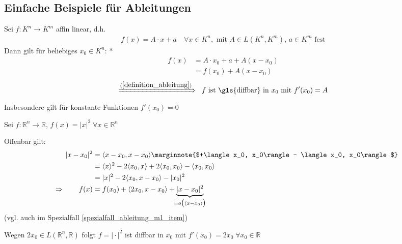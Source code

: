 \subsection*{Einfache Beispiele für Ableitungen}
\begin{example}
	Sei $f:K^n\to K^m$ affin linear, d.h. \begin{align*}
		f(x) = A\cdot x + a\quad \forall x\in K^n, \text{ mit } A\in L(K^n, K^m), \, a\in K^m \text{ fest}
	\end{align*}
	Dann gilt für beliebiges $x_0\in K^n$:
	\zeroAmsmathAlignVSpaces**
	\begin{align*}
		f(x) &= A\cdot x_0 + a + A(x - x_0) \\
		&=f(x_0) + A(x - x_0)
	\end{align*}
	\zeroAmsmathAlignVSpaces
	\begin{align*}
		\xRightarrow{(\ref{definition_ableitung})}\;\; \text{$f$ ist \gls{diffbar} in $x_0$ mit } f'(x_0) = A
	\end{align*}
	Insbesondere gilt für konstante Funktionen $f'(x_0) = 0$
\end{example}
\begin{example}
	Sei $f:\mathbb{R}^n\to \mathbb{R}$, $f(x) = \vert x \vert ^2\;\forall x\in\mathbb{R}^n$
	
	Offenbar gilt:
	\begin{align*}
		&& \vert x - x_0 \vert ^2 &= \langle x - x_0, x - x_0 \rangle \marginnote{$+\langle x_0, x_0\rangle - \langle x_0, x_0\rangle$} \\
		&& &= \langle x \rangle^2 - 2 \langle x_0, x\rangle + 2 \langle x_0, x_0 \rangle - \langle x_0, x_0\rangle \\
		&& &= \vert x \vert ^2 - 2 \langle x_0, x - x_0 \rangle - \vert x_0 \vert ^2 \\
		&&\Rightarrow \qquad f(x) &= f(x_0) + \langle 2x_0, x - x_0 \rangle + \underbrace{\vert x - x_0\vert^2}_{\mathclap{=o\big( \langle x - x_0 \rangle \big)}}
 	\end{align*}
 	(vgl. auch  im Spezialfall \ref{spezialfall_ableitung_m1_item})
 	
 	Wegen $2x_0\in L(\mathbb{R}^n, \mathbb{R})$ folgt $f = \vert \cdot \vert^2$ ist \gls{diffbar} in $x_0$ mit $f'(x_0) = 2 x_0\;\forall x_0\in\mathbb{R}$
\end{example}